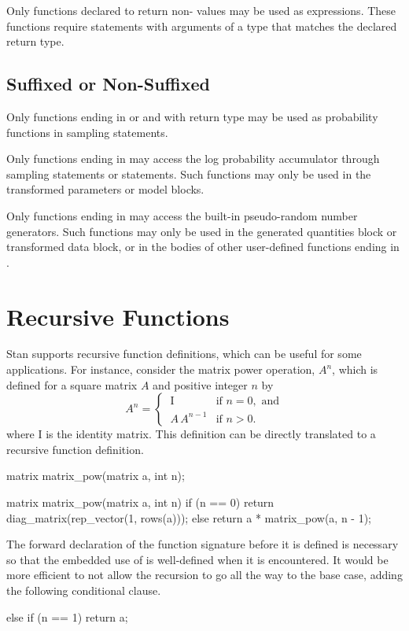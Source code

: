 Only functions declared to return non- values may be used
as expressions.  These functions require  statements with
arguments of a type that matches the declared return type.

\subsection{Suffixed or Non-Suffixed}

Only functions ending in  or  and with
return type  may be used as probability functions in
sampling statements.

Only functions ending in  may access the log probability
accumulator through sampling statements or 
statements.  Such functions may only be used in the transformed
parameters or model blocks.

Only functions ending in  may access the built-in
pseudo-random number generators.  Such functions may only be used in
the generated quantities block or transformed data block, or in the
bodies of other user-defined functions ending in .


\section{Recursive Functions}

Stan supports recursive function definitions, which can be useful for
some applications.  For instance, consider the matrix power operation,
$A^n$, which is defined for a square matrix $A$ and positive integer
$n$ by
\[
A^n 
=
\begin{cases}
\ \mbox{I} & \mbox{if } n = 0, \mbox{ and}
\\[3pt]
\ A \, A^{n-1} & \mbox{if } n > 0.
\end{cases}
\]
%
where $\mbox{I}$ is the identity matrix.  This definition can be
directly translated to a recursive function definition.
%
\begin{stancode}
  matrix matrix_pow(matrix a, int n);

  matrix matrix_pow(matrix a, int n) {
    if (n == 0)
      return diag_matrix(rep_vector(1, rows(a)));
    else 
      return a *  matrix_pow(a, n - 1);
  }
\end{stancode}
%
The forward declaration of the function signature before it is defined
is necessary so that the embedded use of  is
well-defined when it is encountered.  It would be more efficient to
not allow the recursion to go all the way to the base case, adding the
following conditional clause.
%
\begin{stancode}
    else if (n == 1)
      return a;
\end{stancode}



